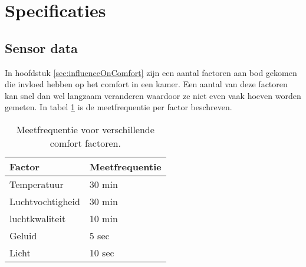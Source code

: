 \section{Specificaties}
\subsection{Sensor data}
In hoofdstuk \ref{sec:influenceOnComfort} zijn een aantal factoren aan bod gekomen die invloed hebben op het comfort in een kamer. Een aantal van deze factoren kan snel dan wel langzaam veranderen waardoor ze niet even vaak hoeven worden gemeten. In tabel \ref{tabel:meetfrequentie} is de meetfrequentie per factor beschreven.
\begin{table}[h]
    \centering
    \begin{tabular}{|l|l|}\hline
        Factor           & Meetfrequentie \\\hline
        Temperatuur      & 30 min         \\\hline
        Luchtvochtigheid & 30 min         \\\hline
        luchtkwaliteit   & 10 min         \\\hline
        Geluid           & 5 sec          \\\hline
        Licht            & 10 sec         \\\hline
    \end{tabular}
    \caption{Meetfrequentie voor verschillende comfort factoren.}
    \label{tabel:meetfrequentie}
\end{table}